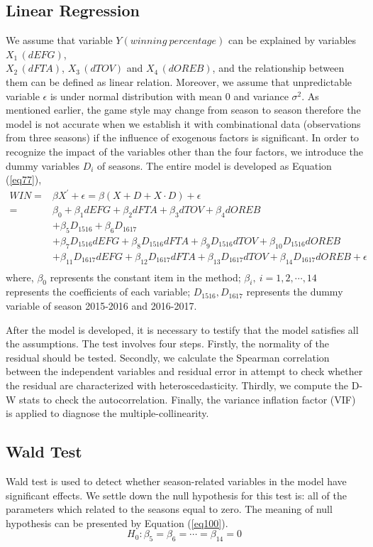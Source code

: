 \documentclass[12pt, a4paper]{article}
\begin{document}
\begin{spacing}{1.5}
\subsection{Linear Regression}
We assume that variable $Y (winning\ percentage)$  can be explained by variables $X_1\,(dEFG)$, \\$X_2\,(dFTA)$, $X_3\,(dTOV)$ and $X_4\,(dOREB)$, and the relationship between them can be defined as linear relation. Moreover, we assume that unpredictable variable $\epsilon$ is under normal distribution with mean 0 and variance $\sigma^2$. As mentioned earlier, the game style may change from season to season therefore the model is not accurate when we establish it with combinational data (observations from three seasons) if the influence of exogenous factors is significant. In order to recognize the impact of the variables other than the four factors, we introduce the dummy variables $D_i$ of seasons. The entire model is developed as Equation (\ref{eq77}),
\begin{equation}
\label{eq77}
\begin{split}
WIN=&\beta{X^{'}}+\epsilon=\beta(X+D+X\cdot{D})+\epsilon\\
=& \beta_0+\beta_1dEFG + \beta_2dFTA+\beta_3dTOV+\beta_4dOREB \\
&+ \beta_5D_{1516}+\beta_6D_{1617}\\
&+\beta_7D_{1516}dEFG+\beta_8D_{1516}dFTA+\beta_9D_{1516}dTOV+\beta_{10}D_{1516}dOREB\\
&+\beta_{11}D_{1617}dEFG+\beta_{12}D_{1617}dFTA+\beta_{13}D_{1617}dTOV+\beta_{14}D_{1617}dOREB + \epsilon \\
\end{split}
\end{equation}
where, 
$\beta_0$ represents the constant item in the method;
$\beta_i,\ i=1, 2, \cdots, 14$ represents the coefficients of each variable;
$D_{1516}, D_{1617}$ represents the dummy variable of season 2015-2016 and 2016-2017.

After the model is developed, it is necessary to testify that the model satisfies all the assumptions. The test involves four steps. Firstly, the normality of the residual should be tested. Secondly, we calculate the Spearman correlation between the independent variables and residual error in attempt to check whether the residual are characterized with heteroscedasticity. Thirdly, we compute the D-W stats to check the autocorrelation. Finally, the variance inflation factor (VIF) is applied to diagnose the multiple-collinearity.
\subsection{Wald Test}
Wald test is used to detect whether season-related variables in the model have significant effects. We settle down the null hypothesis for this test is: all of the parameters which related to the seasons equal to zero. The meaning of null hypothesis can be presented by Equation (\ref{eq100}).
\begin{equation}
	H_0: \beta_5=\beta_6=\cdots=\beta_{14}=0
	\label{eq100}
\end{equation}

\end{spacing}
\end{document}
